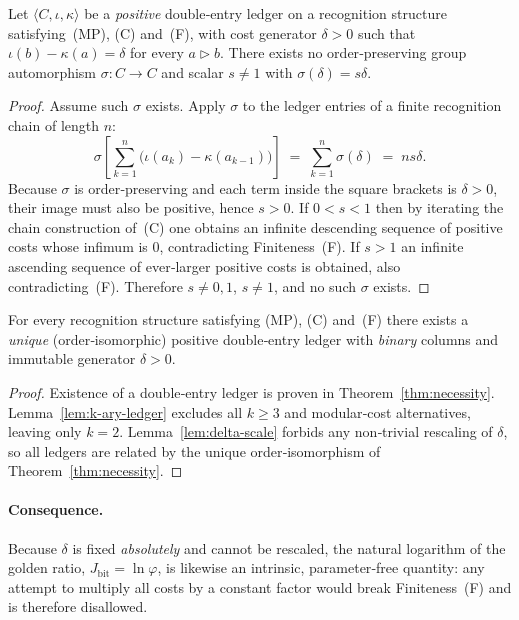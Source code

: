 \begin{lemma}\label{lem:delta-scale}
Let \(\langle C,\iota,\kappa\rangle\) be a
\emph{positive} double‑entry ledger on a recognition structure
satisfying (MP), (C) and (F),
with cost generator \(\delta>0\) such that
\(\iota(b)-\kappa(a)=\delta\) for every \(a\triangleright b\).
There exists no order‑preserving group automorphism
\(\sigma:C\!\to\!C\) and scalar \(s\neq1\) with
\(\sigma(\delta)=s\delta\).
\end{lemma}

\begin{proof}
Assume such \(\sigma\) exists.
Apply \(\sigma\) to the ledger entries of a finite recognition
chain of length \(n\):
\[
  \sigma\!\left[\sum_{k=1}^{n}
     \bigl(\iota(a_k)-\kappa(a_{k-1})\bigr)\right]
  \;=\;
  \sum_{k=1}^{n}
     \sigma(\delta)
  \;=\;
  ns\delta .
\]
Because \(\sigma\) is order‑preserving and each term inside the
square brackets is \(\delta>0\),
their image must also be positive, hence \(s>0\).
If \(0<s<1\) then by iterating the chain construction of (C)
one obtains an infinite descending sequence of positive costs
whose infimum is \(0\), contradicting Finiteness (F).
If \(s>1\) an infinite ascending sequence of ever‑larger positive
costs is obtained, also contradicting (F).
Therefore \(s\neq0,1\), \(s\neq1\), and no such \(\sigma\) exists.
\end{proof}

\begin{theorem}\label{thm:ledger-necessity-strong}
For every recognition structure satisfying \textnormal{(MP)}, \textnormal{(C)}
and \textnormal{(F)} there exists a \emph{unique}
(order‑isomorphic) positive double‑entry ledger with
\emph{binary} columns and immutable generator \(\delta>0\).
\end{theorem}

\begin{proof}
Existence of a double‑entry ledger is proven in Theorem~\ref{thm:necessity}.
Lemma~\ref{lem:k-ary-ledger} excludes all \(k\ge3\) and modular‑cost
alternatives, leaving only \(k=2\).
Lemma~\ref{lem:delta-scale} forbids any non‑trivial rescaling of
\(\delta\), so all ledgers are related by the unique
order‑isomorphism of Theorem~\ref{thm:necessity}.
\end{proof}

\paragraph{Consequence.}
Because \(\delta\) is fixed \emph{absolutely} and cannot be rescaled,
the natural logarithm of the golden ratio,
\(J_{\text{bit}}=\ln\varphi\),
is likewise an intrinsic, parameter‑free quantity: any attempt to
multiply all costs by a constant factor would break
Finiteness (F) and is therefore disallowed.

